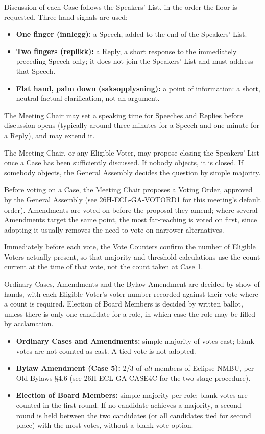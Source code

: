 \documentclass{../../../Common/Latex/Templates/rapport}
\begin{document}
Discussion of each Case follows the Speakers' List, in the order the floor is requested. Three hand signals are used:
\begin{itemize}
  \item \textbf{One finger (innlegg):} a Speech, added to the end of the Speakers' List.
  \item \textbf{Two fingers (replikk):} a Reply, a short response to the immediately preceding Speech only; it does not join the Speakers' List and must address that Speech.
  \item \textbf{Flat hand, palm down (saksopplysning):} a point of information: a short, neutral factual clarification, not an argument.
\end{itemize}
The Meeting Chair may set a speaking time for Speeches and Replies before discussion opens (typically around three minutes for a Speech and one minute for a Reply), and may extend it.

The Meeting Chair, or any Eligible Voter, may propose closing the Speakers' List once a Case has been sufficiently discussed. If nobody objects, it is closed. If somebody objects, the General Assembly decides the question by simple majority.

Before voting on a Case, the Meeting Chair proposes a Voting Order, approved by the General Assembly (see 26H-ECL-GA-VOTORD1 for this meeting's default order). Amendments are voted on before the proposal they amend; where several Amendments target the same point, the most far-reaching is voted on first, since adopting it usually removes the need to vote on narrower alternatives.

Immediately before each vote, the Vote Counters confirm the number of Eligible Voters actually present, so that majority and threshold calculations use the count current at the time of that vote, not the count taken at Case 1.

Ordinary Cases, Amendments and the Bylaw Amendment are decided by show of hands, with each Eligible Voter's voter number recorded against their vote where a count is required. Election of Board Members is decided by written ballot, unless there is only one candidate for a role, in which case the role may be filled by acclamation.

\begin{itemize}
  \item \textbf{Ordinary Cases and Amendments:} simple majority of votes cast; blank votes are not counted as cast. A tied vote is not adopted.
  \item \textbf{Bylaw Amendment (Case 5):} 2/3 of \emph{all} members of Eclipse NMBU, per Old Bylaws \S4.6 (see 26H-ECL-GA-CASE4C for the two-stage procedure).
  \item \textbf{Election of Board Members:} simple majority per role; blank votes are counted in the first round. If no candidate achieves a majority, a second round is held between the two candidates (or all candidates tied for second place) with the most votes, without a blank-vote option.
\end{itemize}
\end{document}
